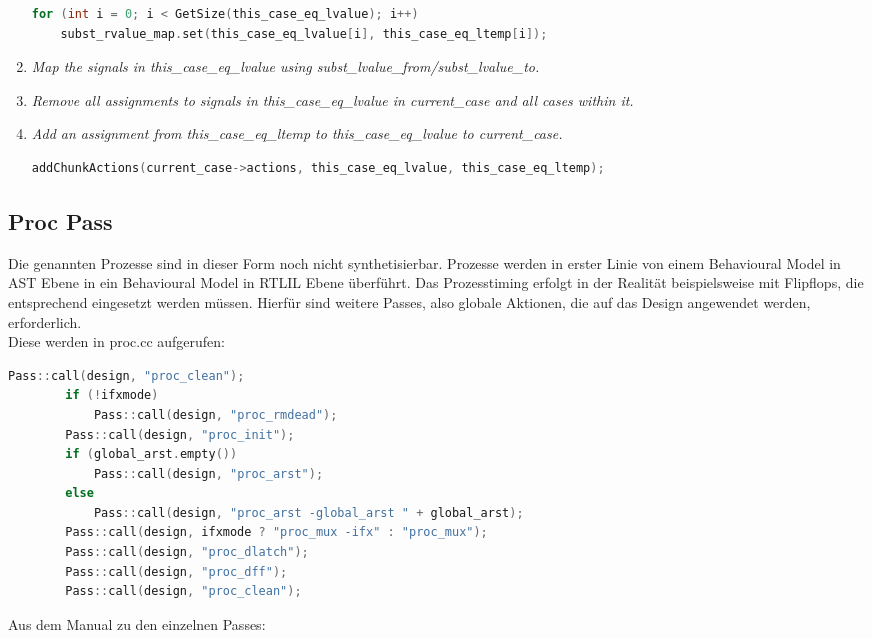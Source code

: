 \documentclass[11pt]{report}
\begin{document}
\begin{enumerate}
\begin{lstlisting}[language=C++]
for (int i = 0; i < GetSize(this_case_eq_lvalue); i++)
	subst_rvalue_map.set(this_case_eq_lvalue[i], this_case_eq_ltemp[i]);
\end{lstlisting}
\item \textit{Map the signals in this\_case\_eq\_lvalue using subst\_lvalue\_from/subst\_lvalue\_to.}
\item \textit{Remove all assignments to signals in this\_case\_eq\_lvalue in current\_case and all cases within it.}
\item \textit{Add an assignment from this\_case\_eq\_ltemp to this\_case\_eq\_lvalue to current\_case.}
\begin{lstlisting}[language=C++]
addChunkActions(current_case->actions, this_case_eq_lvalue, this_case_eq_ltemp);
\end{lstlisting}
\end{enumerate}


\subsection{Proc Pass}
Die genannten Prozesse sind in dieser Form noch nicht synthetisierbar. Prozesse werden in erster Linie von einem Behavioural Model in AST Ebene in ein Behavioural Model in RTLIL Ebene überführt. Das Prozesstiming erfolgt in der Realität beispielsweise mit Flipflops, die entsprechend eingesetzt werden müssen. Hierfür sind weitere Passes, also globale Aktionen, die auf das Design angewendet werden, erforderlich.\\
Diese werden in proc.cc aufgerufen:
\begin{lstlisting}[language=C++]
		Pass::call(design, "proc_clean");
		if (!ifxmode)
			Pass::call(design, "proc_rmdead");
		Pass::call(design, "proc_init");
		if (global_arst.empty())
			Pass::call(design, "proc_arst");
		else
			Pass::call(design, "proc_arst -global_arst " + global_arst);
		Pass::call(design, ifxmode ? "proc_mux -ifx" : "proc_mux");
		Pass::call(design, "proc_dlatch");
		Pass::call(design, "proc_dff");
		Pass::call(design, "proc_clean");
\end{lstlisting}
Aus dem Manual zu den einzelnen Passes:
\\
\\
\end{document}

